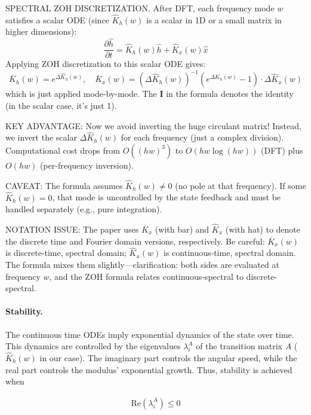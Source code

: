 \begin{ThomasAnnotation}
  SPECTRAL ZOH DISCRETIZATION. After DFT, each frequency mode $w$ satisfies a scalar ODE (since $\widehat{K}_h(w)$ is a scalar in 1D or a small matrix in higher dimensions):
  $$\frac{\partial \widehat{h}}{\partial t} = \widehat{K}_h(w) \widehat{h} + \widehat{K}_x(w) \widehat{x}$$
  Applying ZOH discretization to this scalar ODE gives:
  $$\overline{K}_h(w) = e^{\Delta \widehat{K}_h(w)}, \quad \overline{K}_x(w) = (\Delta \widehat{K}_h(w))^{-1}(e^{\Delta \widehat{K}_h(w)} - 1) \cdot \Delta \widehat{K}_x(w)$$
  which is just  applied mode-by-mode. The $\bm{I}$ in the formula denotes the identity (in the scalar case, it's just 1).
  
  KEY ADVANTAGE: Now we avoid inverting the huge circulant matrix! Instead, we invert the scalar $\Delta \widehat{K}_h(w)$ for each frequency (just a complex division). Computational cost drops from $O((hw)^3)$ to $O(hw \log(hw))$ (DFT) plus $O(hw)$ (per-frequency inversion).
  
  CAVEAT: The formula assumes $\widehat{K}_h(w) \neq 0$ (no pole at that frequency). If some $\widehat{K}_h(w) = 0$, that mode is uncontrolled by the state feedback and must be handled separately (e.g., pure integration).
  
  NOTATION ISSUE: The paper uses $\overline{K}_x$ (with bar) and $\widehat{K}_x$ (with hat) to denote the discrete time and Fourier domain versions, respectively. Be careful: $\overline{K}_x(w)$ is discrete-time, spectral domain; $\widehat{K}_x(w)$ is continuous-time, spectral domain. The formula mixes them slightly---clarification: both sides are evaluated at frequency $w$, and the ZOH formula relates continuous-spectral to discrete-spectral.
\end{ThomasAnnotation}

\paragraph{Stability.} The continuous time ODEs imply exponential dynamics of the state over time. This dynamics are controlled by the eigenvalues $\lambda^A_i$ of the transition matrix $A$ ($\widehat{K}_h(w)$ in our case). The imaginary part controls the angular speed, while the real part controls the modulus' exponential growth. Thus, stability is achieved when

\begin{align}
    \label{eq:stability}
    \mathrm{Re}(\lambda^A_i) \leq 0
\end{align}


